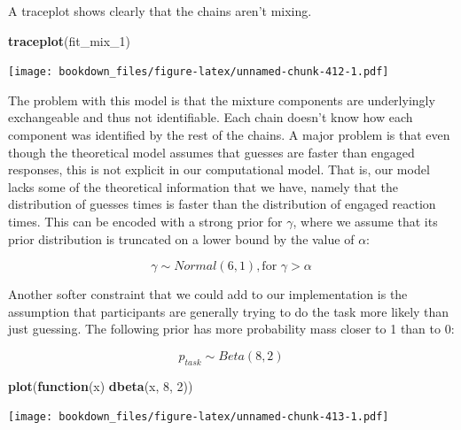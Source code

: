 \documentclass[12pt,]{krantz}
\newenvironment{Shaded}{\begin{snugshade}}{\end{snugshade}}
\newcommand{\KeywordTok}[1]{\textcolor[rgb]{0.13,0.29,0.53}{\textbf{#1}}}
\newcommand{\DecValTok}[1]{\textcolor[rgb]{0.00,0.00,0.81}{#1}}
\newcommand{\ControlFlowTok}[1]{\textcolor[rgb]{0.13,0.29,0.53}{\textbf{#1}}}
\newcommand{\NormalTok}[1]{#1}
\theoremstyle{definition}
\theoremstyle{definition}
\theoremstyle{definition}
\theoremstyle{remark}
\begin{document}
A traceplot shows clearly that the chains aren't mixing.

\begin{Shaded}
\begin{Highlighting}[]
\KeywordTok{traceplot}\NormalTok{(fit_mix_}\DecValTok{1}\NormalTok{) }
\end{Highlighting}
\end{Shaded}

\texttt{[image: bookdown\_files/figure-latex/unnamed-chunk-412-1.pdf]}

The problem with this model is that the mixture components are
underlyingly exchangeable and thus not identifiable. Each chain doesn't
know how each component was identified by the rest of the chains. A
major problem is that even though the theoretical model assumes that
guesses are faster than engaged responses, this is not explicit in our
computational model. That is, our model lacks some of the theoretical
information that we have, namely that the distribution of guesses times
is faster than the distribution of engaged reaction times. This can be
encoded with a strong prior for \(\gamma\), where we assume that its
prior distribution is truncated on a lower bound by the value of
\(\alpha\):

\begin{equation}
\gamma \sim Normal(6, 1), \text{for } \gamma > \alpha
\end{equation}

Another softer constraint that we could add to our implementation is the
assumption that participants are generally trying to do the task more
likely than just guessing. The following prior has more probability mass
closer to 1 than to 0:

\begin{equation}
p_{task} \sim Beta(8, 2)
\end{equation}

\begin{Shaded}
\begin{Highlighting}[]
\KeywordTok{plot}\NormalTok{(}\ControlFlowTok{function}\NormalTok{(x) }\KeywordTok{dbeta}\NormalTok{(x, }\DecValTok{8}\NormalTok{, }\DecValTok{2}\NormalTok{))}
\end{Highlighting}
\end{Shaded}

\texttt{[image: bookdown\_files/figure-latex/unnamed-chunk-413-1.pdf]}
\end{document}
